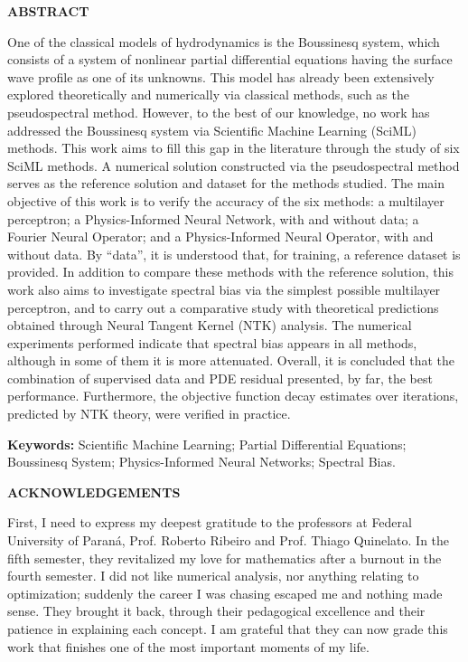 \begin{center}
\textbf{ABSTRACT}
\end{center}
{}
\noindent
One of the classical models of hydrodynamics is the Boussinesq system, which consists of a system of nonlinear partial differential equations having the surface wave profile as one of its unknowns. This model has already been extensively explored theoretically and numerically via classical methods, such as the pseudospectral method. However, to the best of our knowledge, no work has addressed the Boussinesq system via Scientific Machine Learning (SciML) methods. This work aims to fill this gap in the literature through the study of six SciML methods. A numerical solution constructed via the pseudospectral method serves as the reference solution and dataset for the methods studied. The main objective of this work is to verify the accuracy of the six methods: a multilayer perceptron; a Physics-Informed Neural Network, with and without data; a Fourier Neural Operator; and a Physics-Informed Neural Operator, with and without data. By ``data'', it is understood that, for training, a reference dataset is provided. In addition to compare these methods with the reference solution, this work also aims to investigate spectral bias via the simplest possible multilayer perceptron, and to carry out a comparative study with theoretical predictions obtained through Neural Tangent Kernel (NTK) analysis. The numerical experiments performed indicate that spectral bias appears in all methods, although in some of them it is more attenuated. Overall, it is concluded that the combination of supervised data and PDE residual presented, by far, the best performance. Furthermore, the objective function decay estimates over iterations, predicted by NTK theory, were verified in practice.

\vspace{1cm}
\noindent
\textbf{Keywords:} Scientific Machine Learning; Partial Differential Equations; Boussinesq System; Physics-Informed Neural Networks; Spectral Bias.

\pagebreak

\begin{center}
\textbf{ACKNOWLEDGEMENTS}
\end{center}
{}

First, I need to express my deepest gratitude to the professors at Federal University of Paraná, Prof. Roberto Ribeiro and Prof. Thiago Quinelato. In the fifth semester, they revitalized my love for mathematics after a burnout in the fourth semester. I did not like numerical analysis, nor anything relating to optimization; suddenly the career I was chasing escaped me and nothing made sense. They brought it back, through their pedagogical excellence and their patience in explaining each concept. I am grateful that they can now grade this work that finishes one of the most important moments of my life. 

